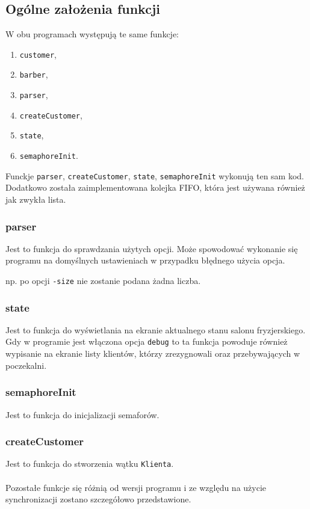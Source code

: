 \documentclass[12pt,a4paper]{article}
\begin{document}
 	\subsection{Ogólne założenia funkcji}
 	W obu programach występują te same funkcje:
 	\begin{enumerate}
 		\item \texttt{customer}, 
 		\item \texttt{barber}, 
 		\item \texttt{parser}, 
 		\item \texttt{createCustomer}, 
 		\item \texttt{state}, 
 		\item \texttt{semaphoreInit}.
	\end{enumerate}
 	Funckje \texttt{parser}, \texttt{createCustomer}, \texttt{state}, 
 	\texttt{semaphoreInit} wykonują ten sam kod. Dodatkowo została zaimplementowana 
 	kolejka \textsc{FIFO}, która jest używana również jak zwykła lista.
 	\subsubsection{parser}
 	Jest to funkcja do sprawdzania użytych opcji. Może spowodować wykonanie 
 	się programu na domyślnych ustawieniach w przypadku błędnego użycia opcja.
 	
 	np. po opcji \texttt{-size} nie zostanie podana żadna liczba.
 	
 	\subsubsection{state}
 	Jest to funkcja do wyświetlania na ekranie aktualnego stanu salonu fryzjerskiego. 
 	Gdy w programie jest włączona opcja \texttt{debug} to ta funkcja powoduje również 
 	wypisanie na ekranie listy klientów, którzy zrezygnowali oraz przebywających w 
 	poczekalni.
 	
 	\subsubsection{semaphoreInit}
 	Jest to funkcja do inicjalizacji semaforów.
 	
 	\subsubsection{createCustomer}
 	Jest to funkcja do stworzenia wątku \texttt{Klienta}.\\\\
 	Pozostałe funkcje się różnią od wersji programu i ze względu na użycie synchronizacji 
 	zostano szczegółowo przedstawione.
 	\pagebreak
\end{document}
